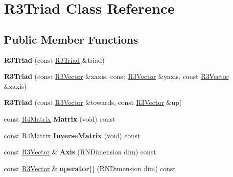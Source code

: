 \hypertarget{class_r3_triad}{}\section{R3\+Triad Class Reference}
\label{class_r3_triad}
\subsection*{Public Member Functions}
\begin{DoxyCompactItemize}
\item 
{\bfseries R3\+Triad} (const \hyperlink{class_r3_triad}{R3\+Triad} \&triad)\hypertarget{class_r3_triad_a4e5e69f9b5ea9a2ea67269be589fda2d}{}\label{class_r3_triad_a4e5e69f9b5ea9a2ea67269be589fda2d}

\item 
{\bfseries R3\+Triad} (const \hyperlink{class_r3_vector}{R3\+Vector} \&xaxis, const \hyperlink{class_r3_vector}{R3\+Vector} \&yaxis, const \hyperlink{class_r3_vector}{R3\+Vector} \&zaxis)\hypertarget{class_r3_triad_a80b6557359ea92feb027538c8ad54256}{}\label{class_r3_triad_a80b6557359ea92feb027538c8ad54256}

\item 
{\bfseries R3\+Triad} (const \hyperlink{class_r3_vector}{R3\+Vector} \&towards, const \hyperlink{class_r3_vector}{R3\+Vector} \&up)\hypertarget{class_r3_triad_aeb0e5a556e39e0e5ac5e6e767571a1cb}{}\label{class_r3_triad_aeb0e5a556e39e0e5ac5e6e767571a1cb}

\item 
const \hyperlink{class_r4_matrix}{R4\+Matrix} {\bfseries Matrix} (void) const \hypertarget{class_r3_triad_a38d0d3c029e713d28e0756dae94c2c59}{}\label{class_r3_triad_a38d0d3c029e713d28e0756dae94c2c59}

\item 
const \hyperlink{class_r4_matrix}{R4\+Matrix} {\bfseries Inverse\+Matrix} (void) const \hypertarget{class_r3_triad_a67a6399fa41010532ddb299c32589def}{}\label{class_r3_triad_a67a6399fa41010532ddb299c32589def}

\item 
const \hyperlink{class_r3_vector}{R3\+Vector} \& {\bfseries Axis} (R\+N\+Dimension dim) const \hypertarget{class_r3_triad_a48f45e93ca512140f4574d1d9b66ed7e}{}\label{class_r3_triad_a48f45e93ca512140f4574d1d9b66ed7e}

\item 
const \hyperlink{class_r3_vector}{R3\+Vector} \& {\bfseries operator\mbox{[}$\,$\mbox{]}} (R\+N\+Dimension dim) const \hypertarget{class_r3_triad_a8a30cc925b606806691d218715a55136}{}\label{class_r3_triad_a8a30cc925b606806691d218715a55136}


\end{DoxyCompactItemize}
